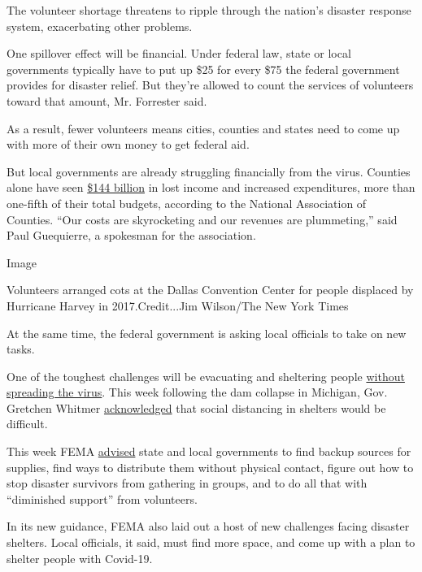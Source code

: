 The volunteer shortage threatens to ripple through the nation's disaster
response system, exacerbating other problems.

One spillover effect will be financial. Under federal law, state or
local governments typically have to put up \$25 for every \$75 the
federal government provides for disaster relief. But they're allowed to
count the services of volunteers toward that amount, Mr. Forrester said.

As a result, fewer volunteers means cities, counties and states need to
come up with more of their own money to get federal aid.

But local governments are already struggling financially from the virus.
Counties alone have seen
\href{https://www.naco.org/sites/default/files/documents/NACo_COVID-19_Fiscal_Impact_Analysis-Executive_Summary_0.pdf}{\$144
billion} in lost income and increased expenditures, more than one-fifth
of their total budgets, according to the National Association of
Counties. ``Our costs are skyrocketing and our revenues are
plummeting,'' said Paul Guequierre, a spokesman for the association.

Image

Volunteers arranged cots at the Dallas Convention Center for people
displaced by Hurricane Harvey in 2017.Credit...Jim Wilson/The New York
Times

At the same time, the federal government is asking local officials to
take on new tasks.

One of the toughest challenges will be evacuating and sheltering people
\href{https://www.nytimes.com/2020/03/21/climate/virus-fema-disaster-aid-shelter.html}{without
spreading the virus}. This week following the dam collapse in Michigan,
Gov. Gretchen Whitmer
\href{https://www.nytimes.com/2020/05/19/us/michigan-dam-breach.html?action=click\&module=Top\%20Stories\&pgtype=Homepage}{acknowledged}
that social distancing in shelters would be difficult.

This week FEMA
\href{https://www.fema.gov/media-library-data/1589997234798-adb5ce5cb98a7a89e3e1800becf0eb65/2020_Hurricane_Pandemic_Plan.pdf}{advised}
state and local governments to find backup sources for supplies, find
ways to distribute them without physical contact, figure out how to stop
disaster survivors from gathering in groups, and to do all that with
``diminished support'' from volunteers.

In its new guidance, FEMA also laid out a host of new challenges facing
disaster shelters. Local officials, it said, must find more space, and
come up with a plan to shelter people with Covid-19.

